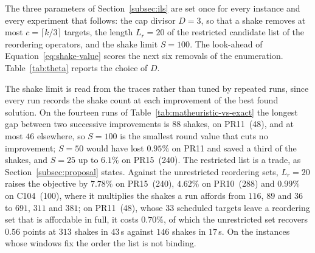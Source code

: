 The three parameters of Section~\ref{subsec:ils} are set once for every instance and every experiment that follows: the cap divisor $D = 3$, so that a shake removes at most $c = \lceil k/3 \rceil$ targets, the length $L_r = 20$ of the restricted candidate list of the reordering operators, and the shake limit $S = 100$. The look-ahead of Equation~\eqref{eq:shake-value} scores the next six removals of the enumeration. Table~\ref{tab:theta} reports the choice of $D$.

The shake limit is read from the traces rather than tuned by repeated runs, since every run records the shake count at each improvement of the best found solution. On the fourteen runs of Table~\ref{tab:matheuristic-vs-exact} the longest gap between two successive improvements is $88$ shakes, on PR11~(48), and at most $46$ elsewhere, so $S = 100$ is the smallest round value that cuts no improvement; $S = 50$ would have lost $0.95\%$ on PR11 and saved a third of the shakes, and $S = 25$ up to $6.1\%$ on PR15~(240). The restricted list is a trade, as Section~\ref{subsec:proposal} states. Against the unrestricted reordering sets, $L_r = 20$ raises the objective by $7.78\%$ on PR15~(240), $4.62\%$ on PR10~(288) and $0.99\%$ on C104~(100), where it multiplies the shakes a run affords from $116$, $89$ and $36$ to $691$, $311$ and $381$; on PR11~(48), whose $33$ scheduled targets leave a reordering set that is affordable in full, it costs $0.70\%$, of which the unrestricted set recovers $0.56$ points at $313$ shakes in $43$\,s against $146$ shakes in $17$\,s. On the instances whose windows fix the order the list is not binding.

